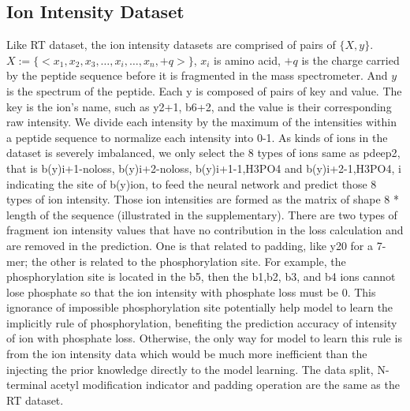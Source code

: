 \subsection{Ion Intensity Dataset}
Like RT dataset, the ion intensity datasets are comprised of pairs of 
\( \{X, y\} \). $X := \{ <x_1, x_2, x_3,\dots, x_i, \dots, x_n, +q> \}$, $x_i$ is amino acid, $+q$ 
is the charge carried by the
peptide sequence before it is fragmented in the mass spectrometer. And \( y \) is the spectrum of the peptide. Each y is composed of pairs of key and value.
The key is the ion's name, such as y2+1, b6+2, and the value is their corresponding raw intensity.
We divide each intensity by the maximum of the intensities within a peptide sequence to normalize each intensity into 0-1. As kinds of ions in the dataset is severely imbalanced, we only select the 8 types of ions same as pdeep2\cite{zeng2019ms}, that is 
b(y)i+1-noloss, b(y)i+2-noloss, b(y)i+1-1,H3PO4 and b(y)i+2-1,H3PO4, i indicating the site of b(y)ion, 
to feed the neural network and predict those 8 types of ion intensity. Those ion intensities are formed as the matrix of shape 8 * length of the sequence (illustrated in the supplementary). 
There are two types of fragment ion intensity values that have no contribution in the loss calculation and are removed in the prediction. One is that related to padding, like y20 for a 7-mer; the other is related to the phosphorylation site. For example, the phosphorylation site is located in the b5, then the b1,b2, b3, and b4 ions cannot lose phosphate so that the ion intensity with phosphate loss must be 0. This ignorance of impossible phosphorylation site potentially help model to learn the implicitly rule of phosphorylation, benefiting the prediction accuracy of intensity of ion with phosphate loss. Otherwise, the only way for model to learn this rule is from the ion intensity data which would be much more inefficient than the injecting the prior knowledge directly to the model learning. 
The data split, N-terminal acetyl modification indicator and padding operation are the same as the RT dataset.

